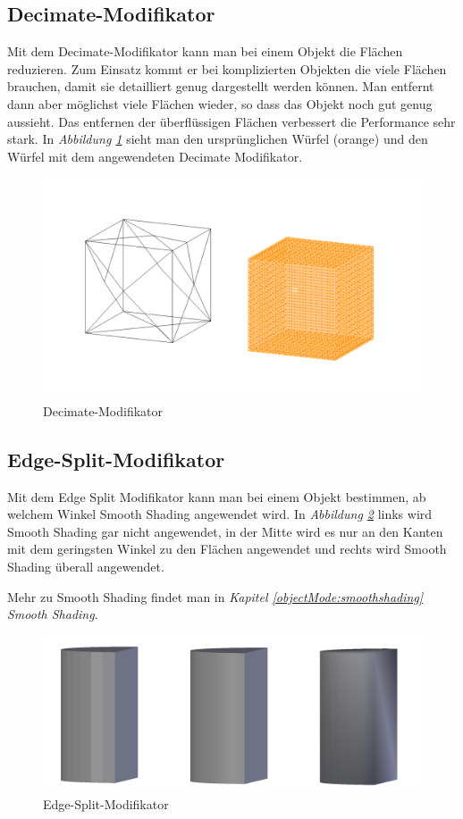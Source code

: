 \subsection{Decimate-Modifikator}
\label{Decimate:heading}
Mit dem Decimate-Modifikator kann man bei einem Objekt die Flächen reduzieren.\citep{blender:decimate_modifier} Zum Einsatz kommt er bei komplizierten
Objekten die viele Flächen brauchen, damit sie detailliert genug dargestellt werden können. Man entfernt dann aber möglichst viele Flächen
wieder, so dass das Objekt noch gut genug aussieht. Das entfernen der überflüssigen Flächen verbessert die Performance sehr stark.
In \textit{Abbildung \ref{modifikatoren:image6}} sieht man den ursprünglichen Würfel (orange) und den Würfel mit dem angewendeten
Decimate Modifikator.
\begin{figure}[h]
    \centering
    \includegraphics[width=.8\textwidth]{images/Modifikatoren-Decimate.png}
    \caption{Decimate-Modifikator}
    \label{modifikatoren:image6}
\end{figure}

\subsection{Edge-Split-Modifikator}
\label{Edge_Split:heading}
Mit dem Edge Split Modifikator kann man bei einem Objekt bestimmen, ab welchem Winkel Smooth Shading angewendet wird.\citep{blender:edgesplit_modifier}
In \textit{Abbildung \ref{modifikatoren:image7}} links wird Smooth Shading gar nicht angewendet, in der Mitte wird es nur an
den Kanten mit dem geringsten Winkel zu den Flächen angewendet und rechts wird Smooth Shading überall angewendet.

Mehr zu Smooth Shading findet man in \textit{Kapitel \ref{objectMode:smoothshading} \dq Smooth Shading\dq}.
\begin{figure}[h]
    \centering
    \includegraphics[width=.8\textwidth]{images/Modifikatoren-Edgesplit.png}
    \caption{Edge-Split-Modifikator}
    \label{modifikatoren:image7}
\end{figure}
